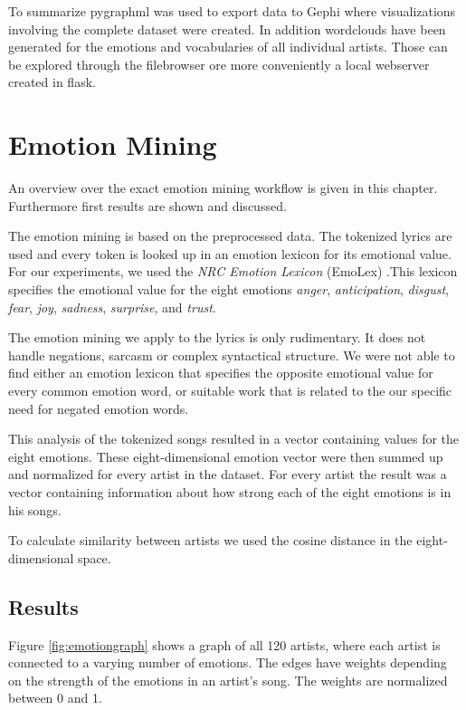 \documentclass[10pt,a4paper]{article}
\begin{document}
	To summarize pygraphml was used to export data to Gephi where visualizations involving the complete dataset were created. In addition wordclouds have been generated for the emotions and vocabularies of all individual artists. Those can be explored through the filebrowser ore more conveniently a local webserver created in flask.
	
	\section{Emotion Mining}
	\label{sec:emotionmining}
	An overview over the exact emotion mining workflow is given in this chapter. Furthermore first results are shown and discussed.
	
	The emotion mining is based on the preprocessed data. The tokenized lyrics are used and every token is looked up in an emotion lexicon for its emotional value. For our experiments, we used the \textit{NRC Emotion Lexicon} (EmoLex) \cite{emolex}.This lexicon specifies the emotional value for the eight emotions \textit{anger}, \textit{anticipation}, \textit{disgust}, \textit{fear}, \textit{joy}, \textit{sadness}, \textit{surprise}, and \textit{trust}.
	
	The emotion mining we apply to the lyrics is only rudimentary. It does not handle negations, sarcasm or complex syntactical structure. We were not able to find either an emotion lexicon that specifies the opposite emotional value for every common emotion word, or suitable work that is related to the our specific need for negated emotion words.
	
	This analysis of the tokenized songs resulted in a vector containing values for the eight emotions. These eight-dimensional emotion vector were then summed up and normalized for every artist in the dataset. For every artist the result was a vector containing information about how strong each of the eight emotions is in his songs.
	
	To calculate similarity between artists we used the cosine distance in the eight-dimensional space.
	
		\subsection{Results}
		Figure \ref{fig:emotiongraph} shows a graph of all 120 artists, where each artist is connected to a varying number of emotions. The edges have weights depending on the strength of the emotions in an artist's song. The weights are normalized between 0 and 1.
		
\end{document}
